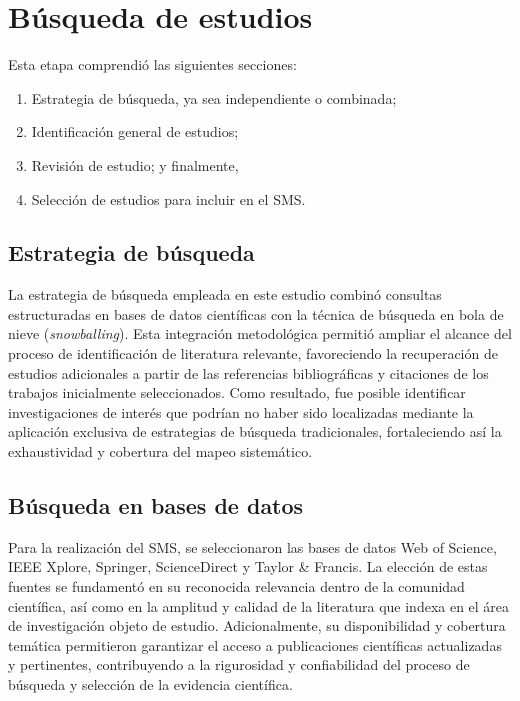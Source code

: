 \newpage
\section{Búsqueda de estudios}

Esta etapa comprendió las siguientes secciones:
\begin{enumerate}
	\item Estrategia de búsqueda, ya sea independiente o combinada;
	\item Identificación general de estudios;
	\item Revisión de estudio; y finalmente,
	\item Selección de estudios para incluir en el \ac{SMS}.
\end{enumerate}


\subsection{Estrategia de búsqueda}\label{subsec:estrategia-busqueda}

La estrategia de búsqueda empleada en este estudio combinó consultas estructuradas en bases de datos científicas con la técnica de búsqueda en bola de nieve (\textit{snowballing}). Esta integración metodológica permitió ampliar el alcance del proceso de identificación de literatura relevante, favoreciendo la recuperación de estudios adicionales a partir de las referencias bibliográficas y citaciones de los trabajos inicialmente seleccionados. Como resultado, fue posible identificar investigaciones de interés que podrían no haber sido localizadas mediante la aplicación exclusiva de estrategias de búsqueda tradicionales, fortaleciendo así la exhaustividad y cobertura del mapeo sistemático.


\subsection{Búsqueda en bases de datos}\label{subsec:busqueda-bases-datos}

Para la realización del \ac{SMS}, se seleccionaron las bases de datos Web of Science, IEEE Xplore, Springer, ScienceDirect y Taylor \& Francis. La elección de estas fuentes se fundamentó en su reconocida relevancia dentro de la comunidad científica, así como en la amplitud y calidad de la literatura que indexa en el área de investigación objeto de estudio. Adicionalmente, su disponibilidad y cobertura temática permitieron garantizar el acceso a publicaciones científicas actualizadas y pertinentes, contribuyendo a la rigurosidad y confiabilidad del proceso de búsqueda y selección de la evidencia científica.


